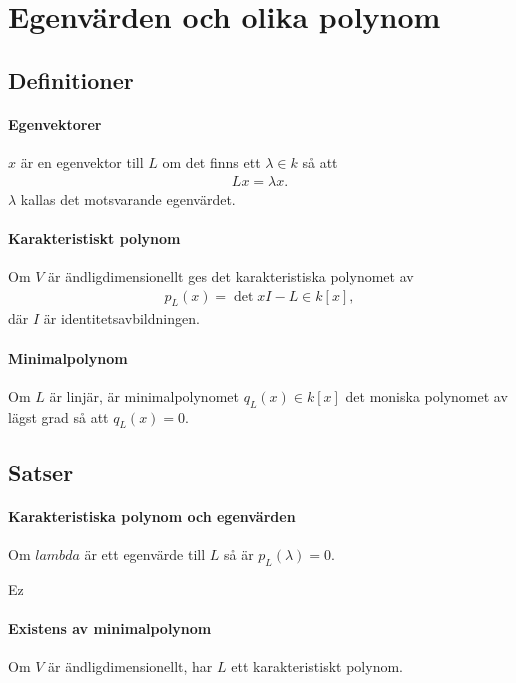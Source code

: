\section{Egenvärden och olika polynom}

\subsection{Definitioner}

\paragraph{Egenvektorer}
$x$ är en egenvektor till $L$ om det finns ett $\lambda\in k$ så att
\begin{align*}
	Lx = \lambda x.
\end{align*}
$\lambda$ kallas det motsvarande egenvärdet.

\paragraph{Karakteristiskt polynom}
Om $V$ är ändligdimensionellt ges det karakteristiska polynomet av
\begin{align*}
	p_{L}(x) = \det{xI - L}\in k[x],
\end{align*}
där $I$ är identitetsavbildningen.

\paragraph{Minimalpolynom}
Om $L$ är linjär, är minimalpolynomet $q_{L}(x)\in k[x]$ det moniska polynomet av lägst grad så att $q_{L}(x) = 0$.

\subsection{Satser}

\paragraph{Karakteristiska polynom och egenvärden}
Om $lambda$ är ett egenvärde till $L$ så är $p_{L}(\lambda) = 0$.

\proof
Ez

\paragraph{Existens av minimalpolynom}
Om $V$ är ändligdimensionellt, har $L$ ett karakteristiskt polynom.

